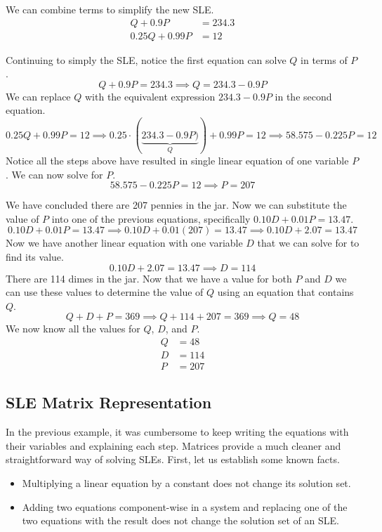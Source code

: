 We can combine terms to simplify the new SLE.
\begin{align*}
    Q + 0.9P &= 234.3 \\
    0.25Q + 0.99P &= 12
\end{align*}

Continuing to simply the SLE, notice the first equation can solve $Q$ in terms of $P$.
$$Q + 0.9P = 234.3 \implies Q = 234.3 - 0.9P$$
We can replace $Q$ with the equivalent expression $234.3-0.9P$ in the second equation.
$$0.25Q + 0.99P = 12 \implies 0.25 \cdot (\underbrace{234.3-0.9P)}_{Q}) + 0.99P =12 \implies 58.575 -0.225P=12$$
Notice all the steps above have resulted in single linear equation of one variable $P$.  We can now solve for $P$.
$$58.575 - 0.225P = 12 \implies P = 207$$

We have concluded there are 207 pennies in the jar.  Now we can substitute the value of $P$ into one of the previous equations, specifically $0.10D + 0.01P = 13.47$.
$$0.10D + 0.01P = 13.47 \implies 0.10D + 0.01(207) = 13.47 \implies 0.10D + 2.07 = 13.47$$
Now we have another linear equation with one variable $D$ that we can solve for to find its value.
$$0.10D + 2.07 = 13.47 \implies D = 114$$
There are 114 dimes in the jar.  Now that we have a value for both $P$ and $D$ we can use these values to determine the value of $Q$ using an equation that contains $Q$.
$$Q+D+P = 369 \implies Q + 114 + 207 = 369 \implies Q = 48$$
We now know all the values for $Q$, $D$, and $P$.
\begin{align*}
    Q &= 48 \\
    D &= 114 \\
    P &= 207
\end{align*}

\subsection*{SLE Matrix Representation}
In the previous example, it was cumbersome to keep writing the equations with their variables and explaining each step.  Matrices provide a much cleaner and straightforward way of solving SLEs.  First, let us establish some known facts.
\begin{itemize}
    \item Multiplying a linear equation by a constant does not change its solution set.
    \item Adding two equations component-wise in a system and replacing one of the two equations with the result does not change the solution set of an SLE.
\end{itemize}

